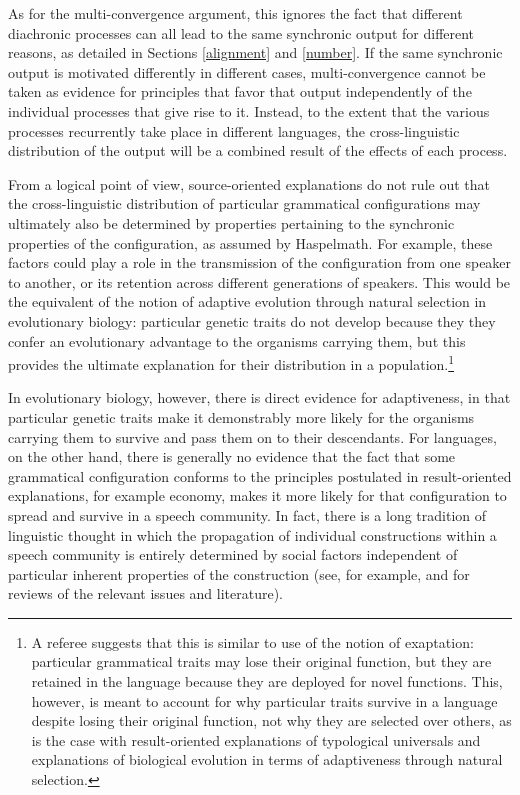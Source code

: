 \documentclass[output=paper]{langsci/langscibook}
\begin{document}
As for the multi-convergence argument, this
ignores the fact that different
diachronic processes can all lead to the same synchronic output for
different reasons, as detailed in Sections \ref{alignment} and
\ref{number}. If the same synchronic output is motivated
differently in different cases, multi-convergence cannot be taken as
evidence for principles that favor that output
independently of the individual processes that give rise to
it. Instead, to the extent that the various processes recurrently take place in
different languages, the cross-linguistic distribution of the output
will be a combined result of the effects of each process. 

From a logical point of view, source-oriented explanations do not rule
out that the cross-linguistic distribution of particular grammatical
configurations may ultimately also be determined by properties
pertaining to the synchronic properties of the configuration, as
assumed by Haspelmath. For example,  these factors could play a role in
the transmission of the configuration from one speaker to another, or
its retention across different generations of speakers. This would be
the equivalent of the notion of adaptive evolution through natural
selection in evolutionary
biology: particular genetic traits do not develop because they
they confer an evolutionary advantage to the organisms
carrying them, but this provides the ultimate explanation for their
distribution in a population.\footnote{A referee suggests that this is
  similar to  use of the notion of
  exaptation: particular grammatical traits may lose their original
  function, but they are retained in the language because they are
  deployed for novel functions.  This, however, is meant to account for why
  particular traits  survive in a language despite losing their
  original function, not why they are
  selected over others, as is the case with  result-oriented
  explanations of typological universals and explanations of
  biological evolution in terms of adaptiveness through natural selection.}
  
\newpage
In evolutionary biology, however, there is direct evidence for
adaptiveness, in that particular genetic traits make it  demonstrably more likely for the organisms
carrying them to survive and pass them on to their
descendants. For languages, on the other hand, there is generally no evidence that the
fact that some grammatical configuration conforms to the principles
postulated in result-oriented explanations, for example economy, makes 
it more likely for that configuration to spread and survive in a
speech community. In fact, there is a long tradition of
linguistic thought in which the propagation of individual
constructions within  a speech community is entirely determined by
social factors independent of particular inherent properties of the
construction (see, for example, \citealt{McMahon1994}
and \citealt{BillLC} for reviews of the relevant issues and
literature). 
\end{document}
